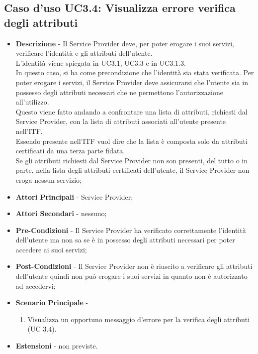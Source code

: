 \subsection{Caso d'uso UC3.4: Visualizza errore verifica degli attributi}
\begin{itemize}
	\item \textbf{Descrizione} - Il Service Provider deve, per poter erogare i suoi servizi, verificare l'identità e gli attributi dell'utente.\\
	L'identità viene spiegata in UC3.1, UC3.3 e in UC3.1.3.\\
	In questo caso, si ha come precondizione che l'identità sia stata verificata.
	Per poter erogare i servizi, il Service Provider deve assicurarsi che l'utente sia in possesso degli attributi necessari che ne permettono l'autorizzazione all'utilizzo.\\
	Questo viene fatto andando a confrontare una lista di attributi, richiesti dal Service Provider, con la lista di attributi associati all'utente presente nell'\gls{ITF}.\\
	Essendo presente nell'\gls{ITF} vuol dire che la lista è composta solo da attributi certificati da una terza parte fidata.\\
	Se gli attributi richiesti dal Service Provider non son presenti, del tutto o in parte, nella lista degli attributi certificati dell'utente, il Service Provider non eroga nessun servizio;
	\item \textbf{Attori Principali} - Service Provider;
	\item \textbf{Attori Secondari} - nessuno;
	\item \textbf{Pre-Condizioni} - Il Service Provider ha verificato correttamente l'identità dell'utente ma non sa se è in possesso degli attributi necessari per poter accedere ai suoi servizi;
	\item \textbf{Post-Condizioni} - Il Service Provider non è riuscito a verificare gli attributi dell'utente quindi non può erogare i suoi servizi in quanto non è autorizzato ad accedervi;
	\item \textbf{Scenario Principale} -
	\begin{enumerate}
		\item Visualizza un opportuno messaggio d'errore per la verifica degli attributi (UC 3.4).
	\end{enumerate}
	\item \textbf{Estensioni} - non previste.
\end{itemize}
\newpage
